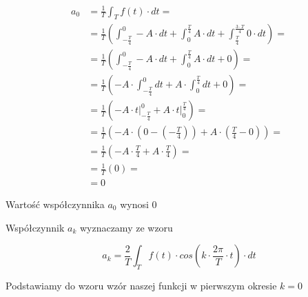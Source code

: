 \begin{task}
\begin{align*}
a_0 &=\frac{1}{T}\int_{T}f(t) \cdot dt =\\
&=\frac{1}{T} \left( \int_{-\frac{T}{4}}^{0} -A \cdot dt + 
\int_{0}^{\frac{T}{4}} A \cdot dt +
\int_{\frac{T}{4}}^{\frac{3\cdot T}{4}} 0 \cdot dt \right ) = \\
&=\frac{1}{T} \left( \int_{-\frac{T}{4}}^{0} -A \cdot dt + 
\int_{0}^{\frac{T}{4}} A \cdot dt + 0 \right ) = \\
&=\frac{1}{T} \left( -A \cdot \int_{-\frac{T}{4}}^{0} dt + 
A \cdot \int_{0}^{\frac{T}{4}} dt + 0 \right ) = \\
&=\frac{1}{T} \left( -A \cdot \left. t \right|_{-\frac{T}{4}}^{0} + 
A \cdot \left. t \right|_{0}^{\frac{T}{4}}\right ) = \\
&=\frac{1}{T} \left( -A \cdot \left( 0 - \left(-\frac{T}{4}\right) \right) + 
A \cdot \left( \frac{T}{4} - 0 \right)\right ) = \\
&=\frac{1}{T} \left( -A \cdot \frac{T}{4} + 
A \cdot \frac{T}{4}\right ) = \\
&=\frac{1}{T} \left( 0 \right ) = \\
&=0
\end{align*}

Wartość współczynnika $a_0$ wynosi $0$


Współczynnik $a_k$ wyznaczamy ze wzoru

\begin{equation}
a_k=\frac{2}{T}\int_{T}f(t) \cdot cos\left( k \cdot \frac{2\pi}{T} \cdot t\right) \cdot dt
\end{equation}

Podstawiamy do wzoru wzór naszej funkcji w pierwszym okresie $k=0$


\end{task}
